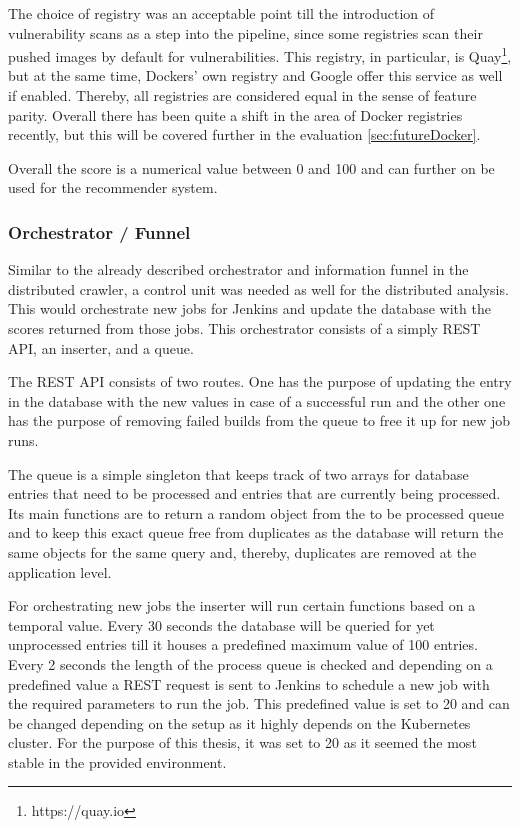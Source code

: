 The choice of registry was an acceptable point till the introduction of vulnerability scans as a step into the pipeline, since some registries scan their pushed images by default for vulnerabilities. This registry, in particular, is Quay\footnote{https://quay.io}, but at the same time, Dockers' own registry and Google offer this service as well if enabled. Thereby, all registries are considered equal in the sense of feature parity. Overall there has been quite a shift in the area of Docker registries recently, but this will be covered further in the evaluation \ref{sec:futureDocker}.

Overall the score is a numerical value between 0 and 100 and can further on be used for the recommender system.

\subsubsection{Orchestrator / Funnel}
\label{sec:proxy}
Similar to the already described orchestrator and information funnel in the distributed crawler, a control unit was needed as well for the distributed analysis. This would orchestrate new jobs for Jenkins and update the database with the scores returned from those jobs. This orchestrator consists of a simply REST API, an inserter, and a queue.

The REST API consists of two routes. One has the purpose of updating the entry in the database with the new values in case of a successful run and the other one has the purpose of removing failed builds from the queue to free it up for new job runs.

The queue is a simple singleton that keeps track of two arrays for database entries that need to be processed and entries that are currently being processed. Its main functions are to return a random object from the to be processed queue and to keep this exact queue free from duplicates as the database will return the same objects for the same query and, thereby, duplicates are removed at the application level.

For orchestrating new jobs the inserter will run certain functions based on a temporal value. Every 30 seconds the database will be queried for yet unprocessed entries till it houses a predefined maximum value of 100 entries. Every 2 seconds the length of the process queue is checked and depending on a predefined value a REST request is sent to Jenkins to schedule a new job with the required parameters to run the job. This predefined value is set to 20 and can be changed depending on the setup as it highly depends on the Kubernetes cluster. For the purpose of this thesis, it was set to 20 as it seemed the most stable in the provided environment.

